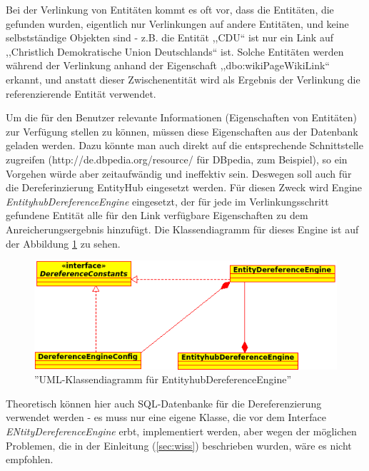 Bei der Verlinkung von Entitäten kommt es oft vor, dass die Entitäten, die gefunden wurden, eigentlich nur Verlinkungen auf andere Entitäten, und keine selbstständige Objekten sind - z.B. die Entität ,,CDU`` ist nur ein Link auf ,,Christlich Demokratische Union Deutschlands`` ist. Solche Entitäten werden während der Verlinkung anhand der Eigenschaft ,,dbo:wikiPageWikiLink`` erkannt, und anstatt dieser Zwischenentität wird als Ergebnis der Verlinkung die referenzierende Entität verwendet.

Um die für den Benutzer relevante Informationen (Eigenschaften von Entitäten) zur Verfügung stellen zu können, müssen diese Eigenschaften aus der Datenbank geladen werden. Dazu könnte man auch direkt auf die entsprechende Schnittstelle zugreifen (http://de.dbpedia.org/resource/ für DBpedia, zum Beispiel), so ein Vorgehen würde aber zeitaufwändig und ineffektiv sein. Deswegen soll auch für die Dereferinzierung EntityHub eingesetzt werden. Für diesen Zweck wird Engine \textit{EntityhubDereferenceEngine} eingesetzt, der für jede im Verlinkungsschritt gefundene Entität alle für den Link verfügbare Eigenschaften zu dem Anreicherungsergebnis hinzufügt. Die Klassendiagramm für dieses Engine ist auf der Abbildung \ref{fig:deref} zu sehen. 

\begin{figure}[ht]
\centering
\includegraphics[width=\textwidth]{Bilder/deref-uml.png}
\caption{''UML-Klassendiagramm für EntityhubDereferenceEngine''}
\label{fig:deref}
\end{figure}
Theoretisch können hier auch SQL-Datenbanke für die Dereferenzierung verwendet werden - es muss nur eine eigene Klasse, die vor dem Interface \textit{ENtityDereferenceEngine} erbt, implementiert werden, aber wegen der möglichen Problemen, die in der Einleitung (\ref{sec:wiss}) beschrieben wurden, wäre es nicht empfohlen.

